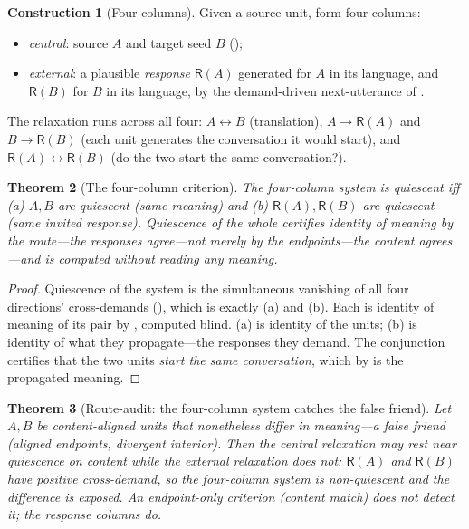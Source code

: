 \documentclass[twocolumn,11pt,a4paper]{article}
\theoremstyle{sup}
\newtheorem{theorem}{Theorem}[section]
\theoremstyle{definition}
\newtheorem{construction}[theorem]{Construction}
\theoremstyle{remark}
\newcommand{\colA}{A}
\newcommand{\colB}{B}
\newcommand{\Resp}{\mathsf{R}}
\begin{document}
\begin{construction}[Four columns]
\label{con:four}
Given a source unit, form four columns:
\begin{itemize}[leftmargin=1.3em,itemsep=1pt]
\item \emph{central}: source $\colA$ and target seed $\colB$ ();
\item \emph{external}: a plausible \emph{response} $\Resp(\colA)$ generated for
$\colA$ in its language, and $\Resp(\colB)$ for $\colB$ in its language, by the
demand-driven next-utterance of .
\end{itemize}
The relaxation runs across all four: $\colA\leftrightarrow\colB$ (translation),
$\colA\!\to\!\Resp(\colA)$ and $\colB\!\to\!\Resp(\colB)$ (each unit generates the
conversation it would start), and $\Resp(\colA)\leftrightarrow\Resp(\colB)$ (do
the two start the same conversation?).
\end{construction}

\begin{theorem}[The four-column criterion]
\label{thm:four}
The four-column system is quiescent iff \textup{(a)} $\colA,\colB$ are quiescent
(same meaning) and \textup{(b)} $\Resp(\colA),\Resp(\colB)$ are quiescent (same
invited response). Quiescence of the whole certifies identity of meaning by the
\emph{route}---the responses agree---not merely by the endpoints---the content
agrees---and is computed without reading any meaning.
\end{theorem}

\begin{proof}
Quiescence of the system is the simultaneous vanishing of all four directions'
cross-demands (), which is exactly (a) and (b). Each is identity
of meaning of its pair by , computed blind. (a) is identity
of the units; (b) is identity of what they propagate---the responses they
demand. The conjunction certifies that the two units \emph{start the same
conversation}, which by  is the propagated meaning.
\end{proof}

\begin{theorem}[Route-audit: the four-column system catches the false friend]
\label{thm:false-friend}
Let $\colA,\colB$ be content-aligned units that nonetheless differ in meaning---a
\emph{false friend} (aligned endpoints, divergent interior). Then the central
relaxation may rest near quiescence on content while the external relaxation does
not: $\Resp(\colA)$ and $\Resp(\colB)$ have positive cross-demand, so the
four-column system is non-quiescent and the difference is exposed. An
endpoint-only criterion (content match) does not detect it; the response columns
do.
\end{theorem}
\end{document}
